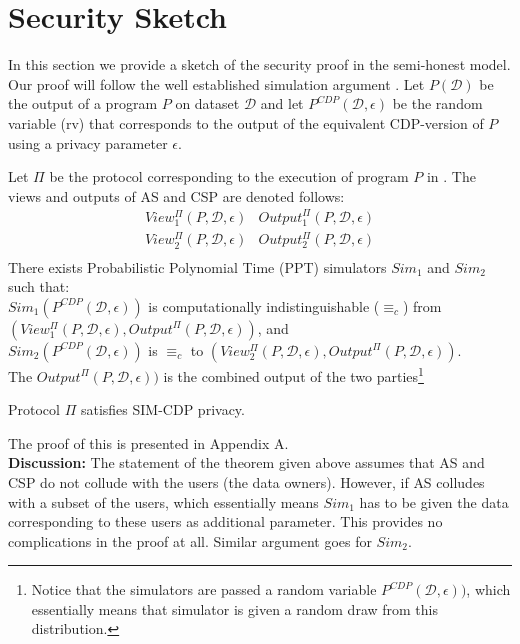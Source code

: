 \section{\system Security Sketch}



In this section we provide a sketch of the security proof in the semi-honest model.
Our proof will follow the well established simulation argument \cite{Oded}. Let
$P(\mathcal{D})$ be the output of a program $P$ on dataset
$\mathcal{D}$ and let $P^{CDP}(\mathcal{D},\epsilon)$ be the random
variable (rv) that corresponds to the output of the equivalent
\textsf{CDP}-version of $P$ using a privacy parameter $\epsilon$.

\begin{theorem}  
\rm
Let $\Pi$ be the protocol corresponding to the execution of program $P$ in \system. The
views and outputs of \textsf{AS} and \textsf{CSP} are denoted follows:
\[
\begin{array}{cc}
View_1^{\Pi}(P,\mathcal{D},\epsilon) & Output_1^{\Pi}(P,\mathcal{D},\epsilon) \\
View_2^{\Pi}(P,\mathcal{D},\epsilon) & Output_2^{\Pi}(P,\mathcal{D},\epsilon) \\
\end{array}
\]
There exists Probabilistic Polynomial Time (PPT) simulators $Sim_1$
and $Sim_2$ such that:\medskip\\
$Sim_1 (P^{CDP}(\mathcal{D},\epsilon))$ is computationally indistinguishable ($\equiv_c$)
from $(View_1^{\Pi}(P,\mathcal{D},\epsilon),Output^{\Pi}(P,\mathcal{D},\epsilon))$, and\\
$Sim_2 (P^{CDP}(\mathcal{D},\epsilon))$ is $\equiv_c$
to $(View_2^{\Pi}(P,\mathcal{D},\epsilon),Output^{\Pi}(P,\mathcal{D},\epsilon))$.\medskip\\
The $Output^{\Pi}(P,\mathcal{D},\epsilon))$ is the combined output of the two
parties\footnote{Notice that the simulators are passed a random variable $P^{CDP}(\mathcal{D},\epsilon))$,
which essentially means that simulator is given a random draw from this distribution.}

\end{theorem}
\noindent
\begin{corollary} Protocol $\Pi$ satisfies \textsf{SIM-CDP} \cite{CDP} privacy.\end{corollary}
\noindent
The proof of this is presented in Appendix A.
\\
{\bf Discussion:} The statement of the theorem given above assumes
that \textsf{AS} and \textsf{CSP} do not collude with the users (the
data owners). However, if \textsf{AS} colludes with a subset of the
users, which essentially means $Sim_1$ has to be given the data
corresponding to these users as additional parameter. This provides no
complications in the proof at all.  Similar argument goes for $Sim_2$.
